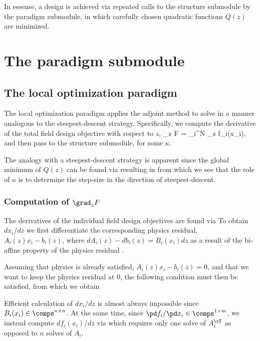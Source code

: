 \documentclass{book}
\begin{document}
In essense, a design is achieved via repeated calls to the structure submodule
    by the paradigm submodule,
    in which carefully chosen quadratic functions $Q(z)$ are minimized.

\section{The paradigm submodule}
\subsection{The local optimization paradigm}
The local optimization paradigm applies the adjoint method to solve 
    in a manner analogous to the steepest-descent strategy.
Specifically, we compute the derivative of the total field design objective with respect to $z$,
        {\grad_z F = \sum_i^N \grad_z f_i(x_i),}
    and then pass 
    to the structure submodule, for some $\kappa$.

The analogy with a steepest-descent strategy is apparent since 
    the global minimum of $Q(z)$ can be found via
    resulting in 
    from which we see that the role of $\kappa$ is to determine the step-size 
    in the direction of steepest-descent.

\subsubsection{Computation of $\grad_z F$}
The derivatives of the individual field design objectives are found via
To obtain ${dx_i}/{dz}$ we first differentiate the corresponding physics residual, 
    $A_i(z) x_i - b_i(z)$,
    where $dA_i(z) - db_i(z) = B_i(x_i)dz$ 
    as a result of the bi-affine property of the physics residual .

Assuming that physics is already satisfied, $A_i(z) x_i - b_i(z) = 0$,
    and that we want to keep the physics residual at 0,
    the following condition must then be satisfied,
    from which we obtain

Efficient calculation of $dx_i/dz$ is almost always impossible since $B_i(x_i) \in \comps^{n \times n}$.
At the same time, since ${\pd f_i}/{\pd x_i} \in \comps^{1 \times m}$, we instead compute $df_i(x_i)/dz$ via
    which requires only one solve of $A_i^\cT$ as opposed to $n$ solves of $A_i$.
\end{document}
